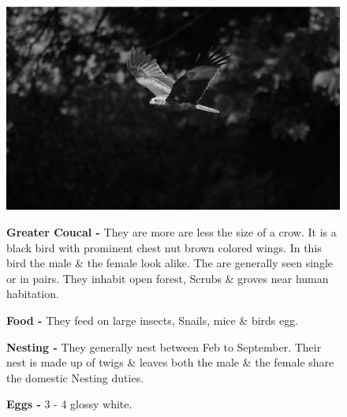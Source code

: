 \begin{figure}[H]
\begin{center}
\includegraphics{figure/Land_birds/01_pariah_kite/pariah-kite.eps}
\end{center}
\medskip
\noindent
{\bf Greater Coucal -} They are more are less the size of a crow. It is a black bird with prominent chest nut brown colored wings. In this bird the male \& the female look alike. The are generally seen single or in pairs. They inhabit open forest, Scrubs \& groves near human habitation. 

\medskip
{\bf Food -} They feed on large insects, Snails, mice \& birds egg.

{\bf Nesting -} They generally nest between Feb to September. Their nest is made up of twigs \& leaves both the male \& the female share the domestic Nesting duties.

{\bf Eggs -} 3 - 4 glossy white.
\end{figure}

\vfill\eject

~\phantom{a}
\vfill

